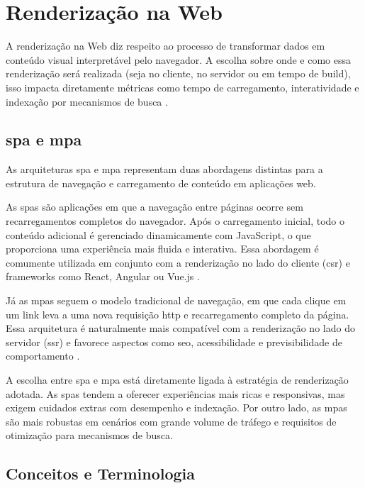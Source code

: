 \section{Renderização na Web}
\label{sec:renderizacao-web}

A renderização na Web diz respeito ao processo de transformar dados em conteúdo visual interpretável pelo navegador. A escolha sobre onde e como essa renderização será realizada (seja no cliente, no servidor ou em tempo de build), isso impacta diretamente métricas como tempo de carregamento, interatividade e indexação por mecanismos de busca \cite{osmani2025}.


\subsection{\acrfull{spa} e \acrfull{mpa}}
\label{subsec:spa-mpa}

As arquiteturas \acrfull{spa} e \acrfull{mpa} representam duas abordagens distintas para a estrutura de navegação e carregamento de conteúdo em aplicações web.

As \acrshort{spa}s são aplicações em que a navegação entre páginas ocorre sem recarregamentos completos do navegador. Após o carregamento inicial, todo o conteúdo adicional é gerenciado dinamicamente com JavaScript, o que proporciona uma experiência mais fluida e interativa. Essa abordagem é comumente utilizada em conjunto com a renderização no lado do cliente (\acrshort{csr}) e frameworks como React, Angular ou Vue.js \cite{atori2024}.

Já as \acrshort{mpa}s seguem o modelo tradicional de navegação, em que cada clique em um link leva a uma nova requisição \acrshort{http} e recarregamento completo da página. Essa arquitetura é naturalmente mais compatível com a renderização no lado do servidor (\acrshort{ssr}) e favorece aspectos como \acrshort{seo}, acessibilidade e previsibilidade de comportamento \cite{osmani2025}.

A escolha entre \acrshort{spa} e \acrshort{mpa} está diretamente ligada à estratégia de renderização adotada. As \acrshort{spa}s tendem a oferecer experiências mais ricas e responsivas, mas exigem cuidados extras com desempenho e indexação. Por outro lado, as \acrshort{mpa}s são mais robustas em cenários com grande volume de tráfego e requisitos de otimização para mecanismos de busca.



\subsection*{Conceitos e Terminologia}

